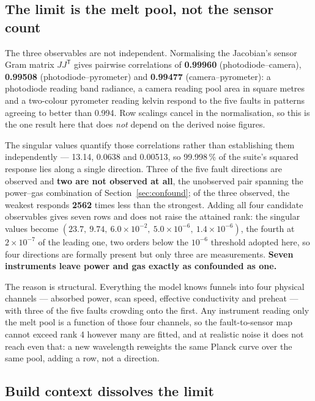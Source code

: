 \documentclass[final,5p,times,twocolumn]{elsarticle}
\begin{document}
\subsection{The limit is the melt pool, not the sensor count}
\label{sec:melt}

The three observables are not independent. Normalising the Jacobian's sensor Gram
matrix $JJ^{\mathsf T}$ gives pairwise correlations of \textbf{0.99960}
(photodiode--camera), \textbf{0.99508} (photodiode--pyrometer) and
\textbf{0.99477} (camera--pyrometer): a photodiode reading band radiance, a
camera reading pool area in square metres and a two-colour pyrometer reading
kelvin respond to the five faults in patterns agreeing to better than 0.994. Row
scalings cancel in the normalisation, so this is the one result here that does
\emph{not} depend on the derived noise figures.

The singular values quantify those correlations rather than establishing them
independently --- 13.14, 0.0638 and 0.00513, so 99.998\,\% of the suite's squared
response lies along a single direction. Three of the five fault directions are
observed and \textbf{two are not observed at all}, the unobserved pair spanning
the power--gas combination of Section~\ref{sec:confound}; of the three observed,
the weakest responds \textbf{2562} times less than the strongest. Adding all four
candidate observables gives seven rows and does not raise the attained rank:
the singular values become $(23.7,\ 9.74,\ 6.0\times10^{-2},\ 5.0\times10^{-6},\
1.4\times10^{-6})$, the fourth at $2\times10^{-7}$ of the leading one, two orders
below the $10^{-6}$ threshold adopted here, so four directions are formally
present but only three are measurements. \textbf{Seven instruments leave power
and gas exactly as confounded as one.}

The reason is structural. Everything the model knows funnels into four physical
channels --- absorbed power, scan speed, effective conductivity and preheat ---
with three of the five faults crowding onto the first. Any instrument reading
only the melt pool is a function of those four channels, so the fault-to-sensor
map cannot exceed rank 4 however many are fitted, and at realistic noise it does
not reach even that: a new wavelength reweights the same Planck curve over the
same pool, adding a row, not a direction.

\subsection{Build context dissolves the limit}
\end{document}
